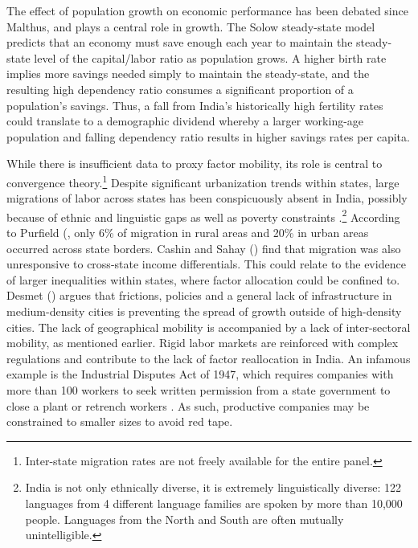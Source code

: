 \documentclass[a4paper, 11pt]{article}
\begin{document}
	The effect of population growth on economic performance has been debated since Malthus, and plays a central role in growth.  The Solow steady-state model predicts that an economy must save enough each year to maintain the steady-state level of the capital/labor ratio as population grows.  A higher birth rate implies more savings needed simply to maintain the steady-state, and the resulting high dependency ratio consumes a significant proportion of a population’s savings.  Thus, a fall from India’s historically high fertility rates could translate to a demographic dividend whereby a larger working-age population and falling dependency ratio results in higher savings rates per capita.\par
	While there is insufficient data to proxy factor mobility, its role is central to convergence theory.\footnote{Inter-state migration rates are not freely available for the entire panel.}  Despite significant urbanization trends within states, large migrations of labor across states has been conspicuously absent in India, possibly because of ethnic and linguistic gaps as well as poverty constraints \citep{kotwal_economic_2011}.\footnote{India is not only ethnically diverse, it is extremely linguistically diverse: 122 languages from 4 different language families are spoken by more than 10,000 people.  Languages from the North and South are often mutually unintelligible.}  According to Purfield (\citeyear{purfield_mind_2006}, only 6\% of migration in rural areas and 20\% in urban areas occurred across state borders.  Cashin and Sahay (\citeyear{cashin_internal_1996}) find that migration was also unresponsive to cross-state income differentials.  This could relate to the evidence of larger inequalities within states, where factor allocation could be confined to.  Desmet (\citeyear{desmet_spatial_2012}) argues that frictions, policies and a general lack of infrastructure in medium-density cities is preventing the spread of growth outside of high-density cities.  The lack of geographical mobility is accompanied by a lack of inter-sectoral mobility, as mentioned earlier.  Rigid labor markets are reinforced with complex regulations and contribute to the lack of factor reallocation in India.  An infamous example is the Industrial Disputes Act of 1947, which requires companies with more than 100 workers to seek written permission from a state government to close a plant or retrench workers \citep{fallon1991impact}. As such, productive companies may be constrained to smaller sizes to avoid red tape.  
\end{document}
